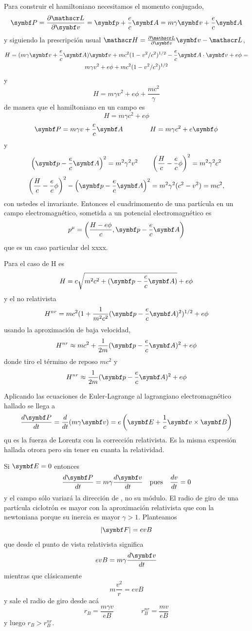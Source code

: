 \documentclass[10pt,oneside]{CBFT_book}
\begin{document}
Para construir el hamiltoniano necesitamos el momento conjugado,
\[
	\vb{P} = \dpar{\Lag}{\vb{v}} = \vb{p} + \frac{e}{c}\vb{A} = m\gamma \vb{v} + \frac{e}{c}\vb{A}
\]
y siguiendo la prescripción usual $\Ham = \dpar{\Lag}{\vb{v}}\vb{v} -\Lag $,
\begin{multline*}
	H = ( m\gamma \vb{v} + \frac{e}{c}\vb{A} )\vb{v} + mc^2(1-v^2/c^2)^{1/2} -
		\frac{e}{c}\pe{A}{v} + e\phi = \\
		m\gamma v^2 + e\phi + mc^2(1 - v^2/c^2)^{1/2}
\end{multline*}
y 
\[
	H =  m \gamma v^2 + e\phi + \frac{m c^2}{\gamma}  
\]
de manera que el hamiltoniano en un campo es 
\[
	H = m \gamma c^2 + e \phi
\]
\[
	\vb{P} = m \gamma v + \frac{e}{c} \vb{A} \qquad \qquad H = m \gamma c^2 + e \vb{\phi}
\]
y
\[
	\left( \vb{p} - \frac{e}{c}\vb{A} \right)^2 = m^2 \gamma^2 v^2 \qquad 
	\left( \frac{H}{c} - \frac{e}{c}\phi \right)^2 = m^2 \gamma^2 c^2
\]
\[
	\left( \frac{H}{c} - \frac{e}{c}\phi \right)^2 - \left( \vb{p} - \frac{e}{c}\vb{A} \right)^2 =
	m^2 \gamma^2 ( c^2 - v^2 ) = mc^2,
\]
con ustedes el invariante. Entonces el cuadrimomento de una partícula en un campo electromagnético,
sometida a un potencial electromagnético es 
\[
	p^\mu = \left( \frac{H-e\phi}{c}, \vb{p} - \frac{e}{c}\vb{A} \right)
\]
que es un caso particular del xxxx.

Para el caso de H es 
\[
	H = c \sqrt{ m^2 c^2 + ( \vb{p} - \frac{e}{c}\vb{A} )} + e \phi
\]
y el no relativista
\[
	H^{nr} = m c^2 ( 1 + \frac{1}{m^2 c^2}(\vb{p} - \frac{e}{c}\vb{A} )^2 )^{1/2} + e \phi
\]
usando la aproximación de baja velocidad,
\[
	H^{nr} \approx m c^2 + \frac{1}{2m} ( \vb{p} - \frac{e}{c}\vb{A} )^2 + e \phi
\]
donde tiro el término de reposo $mc^2$ y
\[
	H^{nr} \approx \frac{1}{2m} ( \vb{p} - \frac{e}{c}\vb{A} )^2 + e \phi
\]

Aplicando las ecuaciones de Euler-Lagrange al lagrangiano electromagnético hallado se llega a
\[
	\dtot{\vb{P}}{t} = \dtot{}{t}(m\gamma\vb{v}) = e \left(  \vb{E} + \frac{1}{c}\pv{v}{B} \right)
\]
qu es la fuerza de Lorentz con la corrección relativista. Es la misma expresión hallada otrora pero
sin tener en cuanta la relatividad.

Si $\vb{E}=0$ entonces 
\[
	\dtot{\vb{P}}{t} = m \gamma \dtot{\vb{v}}{t} \quad \text{pues} \quad \dtot{v}{t} = 0 
\]
y el campo  sólo variará la dirección de , no su módulo.
El radio de giro de una partícula ciclotrón es mayor con la aproximación relativista que con la newtoniana
porque su inercia es mayor $\gamma > 1$. Planteamos
\[
	|\vb{F}| = e v B
\]
que desde el punto de vista relativista significa
\[
	e v B =  m \gamma \dtot{\vb{v}}{t}
\]
mientras que clásicamente 
\[
	m \frac{v^2}{r} = e v B 
\]
y sale el radio de giro desde acá
\[
	r_B = \frac{m\gamma v}{eB} \qquad\qquad r_B^{nr} = \frac{m v}{eB}
\]
y luego $ r_B > r_B^{nr}$.
\end{document}
